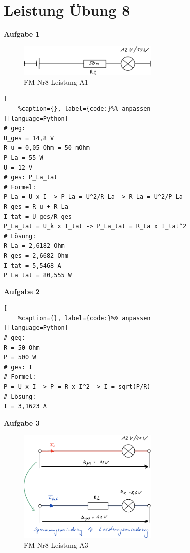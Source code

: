 \section{Leistung Übung 8}\label{leistung-uebung-8}

\textbf{Aufgabe 1}

\begin{figure}[!ht]%
\centering
\includegraphics[width=0.6\textwidth]{images/Skizze/26_FM_Nr8_Leistung_A1.pdf}
\caption{FM Nr8 Leistung A1}
\end{figure}

\lstset{language=Python}%
\begin{lstlisting}[
	%caption={}, label={code:}%% anpassen
][language=Python]
# geg:
U_ges = 14,8 V
R_u = 0,05 Ohm = 50 mOhm
P_La = 55 W
U = 12 V
# ges: P_La_tat
# Formel:
P_La = U x I -> P_La = U^2/R_La -> R_La = U^2/P_La
R_ges = R_u + R_La
I_tat = U_ges/R_ges
P_La_tat = U_k x I_tat -> P_La_tat = R_La x I_tat^2
# Lösung:
R_La = 2,6182 Ohm
R_ges = 2,6682 Ohm
I_tat = 5,5468 A
P_La_tat = 80,555 W
\end{lstlisting}

\textbf{Aufgabe 2}

\lstset{language=Python}%
\begin{lstlisting}[
	%caption={}, label={code:}%% anpassen
][language=Python]
# geg:
R = 50 Ohm
P = 500 W
# ges: I
# Formel:
P = U x I -> P = R x I^2 -> I = sqrt(P/R)
# Lösung:
I = 3,1623 A
\end{lstlisting}

\newpage

\textbf{Aufgabe 3}

\begin{figure}[!ht]%
\centering
\includegraphics[width=0.6\textwidth]{images/Skizze/26_FM_Nr8_Leistung_A3.pdf}
\caption{FM Nr8 Leistung A3}
\end{figure}

